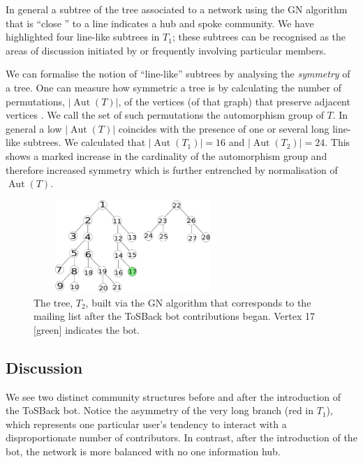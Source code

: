 \documentclass{sig-alternate}
\DeclareMathOperator{\Aut}{Aut}
\begin{document}
In general a subtree of the tree associated to a network using the GN algorithm that is “close ” to a line indicates a hub and spoke community. We have highlighted four line-like subtrees in $T_1$; these subtrees can be recognised as the areas of discussion initiated by or frequently involving particular members.

We can formalise the notion of “line-like” subtrees by analysing the \emph{symmetry} of  
a tree.  One can measure how symmetric
a tree is by calculating the number of permutations, $\lvert \Aut(T) \rvert$, of the
vertices (of that graph) that preserve adjacent vertices \cite{bela:mgt}. We
call the set of such permutations the automorphism group of $T$. In general a low $\lvert \Aut(T) \rvert$ coincides with the presence of one or several long line-like subtrees.  We calculated that $\lvert \Aut(T_1)\rvert = 16$ and $\vert \Aut(T_2)\rvert = 24$.  This shows a marked
increase in the cardinality of the automorphism group and
therefore increased symmetry which is further entrenched by normalisation of $\Aut(T)$.

\begin{figure}[H]
\includegraphics[width=7.5cm, height=3.5cm]{t26.pdf}\caption[width=7]{ The tree, $T_2$, built via the GN algorithm that corresponds to the mailing list after the ToSBack bot contributions began.  Vertex 17 [green] indicates the bot. }\label{fig:t2}
\end{figure}


\subsection{Discussion}

We see two distinct community structures before and after the introduction of the ToSBack bot. Notice the asymmetry of the very long branch (red in $T_1$), which represents one particular user's tendency to interact with a disproportionate number of contributors. In contrast, after the introduction of the bot, the network is more balanced with no one information hub. %
\end{document}
